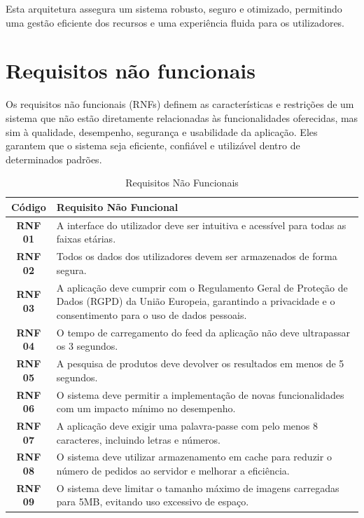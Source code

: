 \documentclass[a4paper, 12pt]{article} %
\begin{document}
Esta arquitetura assegura um sistema robusto, seguro e otimizado, permitindo uma gestão eficiente dos recursos e uma experiência fluida para os utilizadores.



\newpage
\section{Requisitos não funcionais}

Os requisitos não funcionais (RNFs) definem as características e restrições de um sistema que não estão diretamente relacionadas às funcionalidades oferecidas, mas sim à qualidade, desempenho, segurança e usabilidade da aplicação. Eles garantem que o sistema seja eficiente, confiável e utilizável dentro de determinados padrões.

\begin{table}[H]
	\centering
	\renewcommand{\arraystretch}{1.3}
	\begin{tabular}{|c|p{12cm}|}
		\hline
		\textbf{Código} & \textbf{Requisito Não Funcional} \\
		\hline
		\textbf{RNF 01} & A interface do utilizador deve ser intuitiva e acessível para todas as faixas etárias. \\
		\hline
		\textbf{RNF 02} & Todos os dados dos utilizadores devem ser armazenados de forma segura. \\
		\hline
		\textbf{RNF 03} & 	A aplicação deve cumprir com o Regulamento Geral de Proteção de Dados (RGPD) da União Europeia, garantindo a privacidade e o consentimento para o uso de dados pessoais. \\
		\hline
		\textbf{RNF 04} & O tempo de carregamento do feed da aplicação não deve ultrapassar os 3 segundos. \\
		\hline
		\textbf{RNF 05} & A pesquisa de produtos deve devolver os resultados em menos de 5 segundos.\\
		\hline
		\textbf{RNF 06} & O sistema deve permitir a implementação de novas funcionalidades com um impacto mínimo no desempenho. \\
		\hline
		\textbf{RNF 07} & A aplicação deve exigir uma palavra-passe com pelo menos 8 caracteres, incluindo letras e números. \\
		\hline
		\textbf{RNF 08} & O sistema deve utilizar armazenamento em cache para reduzir o número de pedidos ao servidor e melhorar a eficiência. \\
		\hline
		\textbf{RNF 09} & O sistema deve limitar o tamanho máximo de imagens carregadas para 5MB, evitando uso excessivo de espaço. \\
		\hline
	\end{tabular}
	\caption{Requisitos Não Funcionais}
	\label{tab:requisitos_nao_funcionais}
\end{table}
\end{document}
